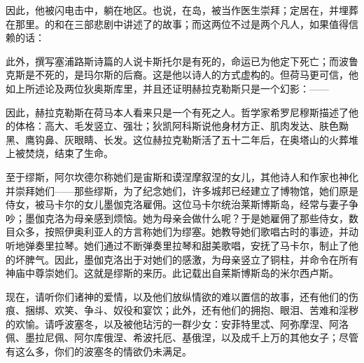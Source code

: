 \par

因此，他被闪电击中，躺在地区。也说，在岛，被当作医生崇拜；定居在，并埋葬在那里。的和在三部悲剧中讲述了的故事；而这两位不过是两个凡人，如果值得信赖的话：\par

\par

此外，撰写塞浦路斯诗篇的人说卡斯托尔是有死的，命运已为他定下死亡；而波鲁克斯是不死的，是玛尔斯的后裔。这是他以诗人的方式虚构的。但荷马更可信，他如上所述论及两位狄奥斯库里，并且还证明赫拉克勒斯只是一个幻影：——\par

\par

因此，赫拉克勒斯在荷马本人看来只是一个有死之人。哲学家希罗尼穆斯描述了他的体格：高大、毛发竖立、强壮；狄凯阿科斯说他身材方正、肌肉发达、肤色黝黑、鹰钩鼻、灰眼睛、长发。这位赫拉克勒斯活了五十二年后，在奥塔山的火葬堆上被焚烧，结束了生命。\par

至于缪斯，阿尔坎德尔称她们是宙斯和谟涅摩叙涅的女儿，其他诗人和作家也神化并崇拜她们——那些缪斯，为了纪念她们，许多城邦已经建立了博物馆，她们原是侍女，被马卡尔的女儿墨伽克洛雇佣。这位马卡尔统治莱斯博斯岛，经常与妻子争吵；墨伽克洛为母亲感到烦恼。她为母亲会做什么呢？于是她雇佣了那些侍女，数目众多，按照伊奥利亚人的方言称她们为缪塞。她教导她们歌唱古时的事迹，并动听地弹奏里拉琴。她们通过不断弹奏里拉琴和甜美歌唱，安抚了马卡尔，制止了他的坏脾气。因此，墨伽克洛出于对她们的感激，为母亲竖立了铜柱，并命令在所有神庙中尊崇她们。这就是缪斯的来历。此记载出自莱斯博斯岛的米尔西卢斯。\par

现在，请听你们诸神的爱情，以及他们放纵情欲的难以置信的故事，还有他们的伤痕、捆绑、欢笑、争斗、奴役和宴饮；此外，还有他们的拥抱、眼泪、苦难和淫秽的欢愉。请呼波塞冬，以及被他玷污的一群少女：安菲特里忒、阿弥摩涅、阿洛佩、墨拉尼佩、阿尔库俄涅、希波托厄、基俄涅，以及成千上万的其他女子；尽管有这么多，你们的波塞冬的情欲仍未满足。\par


